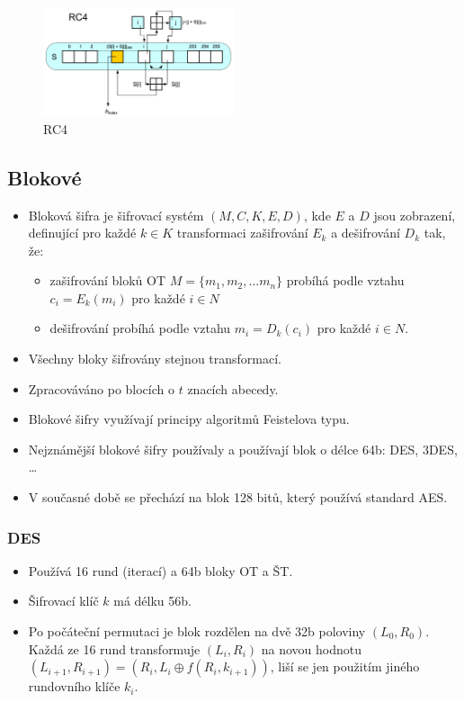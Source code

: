 \documentclass{szzclass}
\begin{document}
\begin{figure}[!ht]
  \centering
  \includegraphics[width=0.5\textwidth]{topics/bi-spol-07/images/rc4}
  \caption{RC4}
\end{figure}

\subsection{Blokové}
\begin{itemize}
\item Bloková šifra je šifrovací systém $(M,C,K,E,D)$, kde $E$ a $D$ jsou zobrazení, definující pro každé $k\in K$ transformaci zašifrování $E_k$ a dešifrování $D_k$ tak, že:
\begin{itemize}
\item zašifrování bloků OT $M=\{m_1,m_2,\dots m_n\}$ probíhá podle vztahu $c_i=E_k(m_i)$ pro každé $i\in N$
\item dešifrování probíhá podle vztahu $m_i = D_k (c_i)$ pro každé $i\in N$.
\end{itemize}
\item Všechny bloky šifrovány stejnou transformací.
\item Zpracováváno po blocích o $t$ znacích abecedy.
\item Blokové šifry využívají principy algoritmů Feistelova typu.
\item Nejznámější blokové šifry používaly a používají blok o délce 64b: DES, 3DES, \dots
\item V současné době se přechází na blok 128 bitů, který používá standard AES.
\end{itemize}

\subsubsection{DES}
\begin{itemize}
\item Používá 16 rund (iterací) a 64b bloky OT a ŠT.
\item Šifrovací klíč $k$ má délku 56b.
\item Po počáteční permutaci je blok rozdělen na dvě 32b poloviny $(L_0,R_0)$. Každá ze 16 rund transformuje $(L_i, R_i)$ na novou hodnotu $(L_{i+1},R_{i+1}) = (R_i, L_i \oplus f(R_i,k_{i+1}))$, liší se jen použitím jiného rundovního klíče $k_i$.
\end{itemize}
\end{document}
